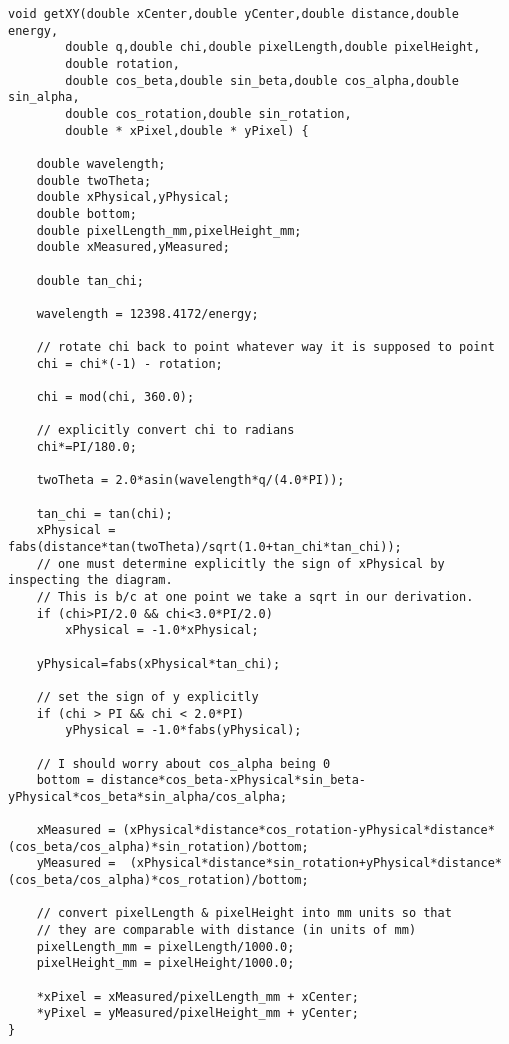 \begin{lstlisting}[caption={The Code to convert $(Q,\chi)$ values into pixel coordinates on a real detector},label=getXY]
void getXY(double xCenter,double yCenter,double distance,double energy,
        double q,double chi,double pixelLength,double pixelHeight,
        double rotation,
        double cos_beta,double sin_beta,double cos_alpha,double sin_alpha,
        double cos_rotation,double sin_rotation,
        double * xPixel,double * yPixel) {

    double wavelength;
    double twoTheta;
    double xPhysical,yPhysical;
    double bottom;
    double pixelLength_mm,pixelHeight_mm;
    double xMeasured,yMeasured;

    double tan_chi;

    wavelength = 12398.4172/energy;

    // rotate chi back to point whatever way it is supposed to point
    chi = chi*(-1) - rotation;

    chi = mod(chi, 360.0);
    
    // explicitly convert chi to radians
    chi*=PI/180.0;

    twoTheta = 2.0*asin(wavelength*q/(4.0*PI));

    tan_chi = tan(chi);
    xPhysical = fabs(distance*tan(twoTheta)/sqrt(1.0+tan_chi*tan_chi));
    // one must determine explicitly the sign of xPhysical by inspecting the diagram.
    // This is b/c at one point we take a sqrt in our derivation.
    if (chi>PI/2.0 && chi<3.0*PI/2.0) 
        xPhysical = -1.0*xPhysical;

    yPhysical=fabs(xPhysical*tan_chi);

    // set the sign of y explicitly
    if (chi > PI && chi < 2.0*PI)
        yPhysical = -1.0*fabs(yPhysical);

    // I should worry about cos_alpha being 0
    bottom = distance*cos_beta-xPhysical*sin_beta-yPhysical*cos_beta*sin_alpha/cos_alpha;

    xMeasured = (xPhysical*distance*cos_rotation-yPhysical*distance*(cos_beta/cos_alpha)*sin_rotation)/bottom;
    yMeasured =  (xPhysical*distance*sin_rotation+yPhysical*distance*(cos_beta/cos_alpha)*cos_rotation)/bottom;

    // convert pixelLength & pixelHeight into mm units so that
    // they are comparable with distance (in units of mm)
    pixelLength_mm = pixelLength/1000.0;
    pixelHeight_mm = pixelHeight/1000.0;

    *xPixel = xMeasured/pixelLength_mm + xCenter;
    *yPixel = yMeasured/pixelHeight_mm + yCenter;
}
\end{lstlisting}
